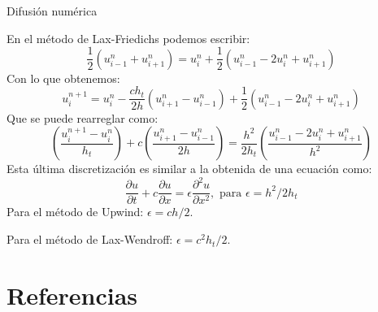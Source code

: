 \documentclass{beamer}
\begin{document}
\begin{frame}{Difusi\'on num\'erica }

{\small En el m\'etodo de Lax-Friedichs podemos escribir:
\begin{displaymath}
\dfrac{1}{2}\left(u_{i-1}^{n} + u_{i+1}^{n}\right) =  u_{i}^{n} + \dfrac{1}{2}\left(u_{i-1}^{n} - 2 u_{i}^{n} + u_{i+1}^{n}\right)
\end{displaymath}
Con lo que obtenemos:
\begin{displaymath}
u_{i}^{n+1} =  u_{i}^{n}  - \dfrac{c h_t}{2 h}\left(u_{i+1}^{n} - u_{i-1}^{n} \right) + \dfrac{1}{2}\left(u_{i-1}^{n} - 2 u_{i}^{n} + u_{i+1}^{n}\right)
\end{displaymath}		
Que se puede rearreglar como:
\begin{displaymath}
\left(\dfrac{u_{i}^{n+1} - u_{i}^{n}}{h_t}\right) + c\left(\dfrac{u_{i+1}^{n} - u_{i-1}^{n}}{2 h} \right) = \dfrac{h^2}{2h_t}\left(\dfrac{u_{i-1}^{n} - 2 u_{i}^{n} + u_{i+1}^{n}}{h^2}\right)
\end{displaymath}		
Esta \'ultima discretizaci\'on es similar a la obtenida de una ecuaci\'on como:
\begin{displaymath}
\dfrac{\partial u}{\partial t} + c \dfrac{\partial u}{\partial x} = \epsilon \dfrac{\partial^2 u}{\partial x^2}, \text{ para } \epsilon = h^2 / 2 h_t
\end{displaymath}
Para el m\'etodo de Upwind: $\epsilon = c h / 2$.

Para el m\'etodo de Lax-Wendroff: $\epsilon = c^2 h_t / 2$.
}

\end{frame}



\section<presentation>{Referencias}
\end{document}
